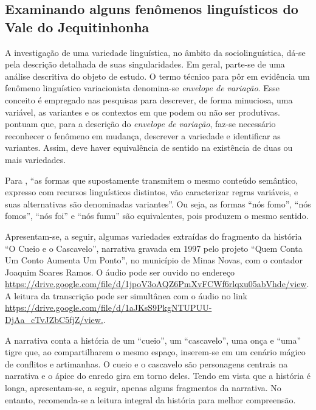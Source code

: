 \documentclass[portuguese]{textolivre}
\begin{document}
\subsection{Examinando alguns fenômenos linguísticos do Vale do Jequitinhonha}

A investigação de uma variedade linguística, no âmbito da sociolinguística, dá-se pela descrição detalhada de suas singularidades. Em geral, parte-se de uma análise descritiva do objeto de estudo. O termo técnico para pôr em evidência um fenômeno linguístico variacionista denomina-se \textit{envelope de variação}. Esse conceito é empregado nas pesquisas para descrever, de forma minuciosa, uma variável, as variantes e os contextos em que podem ou não ser produtivas. \textcite{coelho2012sociolinguistica} pontuam que, para a descrição do \textit{envelope de variação}, faz-se necessário reconhecer o fenômeno em mudança, descrever a variedade e identificar as variantes. Assim, deve haver equivalência de sentido na existência de duas ou mais variedades.
 
Para \textcite[p.~68]{BortoniRicardo2019}, “as formas que supostamente transmitem o mesmo conteúdo semântico, expresso com recursos linguísticos distintos, vão caracterizar regras variáveis, e suas alternativas são denominadas variantes”. Ou seja, as formas “nós fomo”, “nós fomos”, “nós foi” e “nós fumu” são equivalentes, pois produzem o mesmo sentido.

Apresentam-se, a seguir, algumas variedades extraídas do fragmento da história “O Cueio e o Cascavelo”, narrativa gravada em 1997 pelo projeto “Quem Conta Um Conto Aumenta Um Ponto”, no município de Minas Novas, com o contador Joaquim Soares Ramos. O áudio pode ser ouvido no endereço \url{https://drive.google.com/file/d/1jpoV3oAQZ6PmXvFCWf6rlqxu05abVhde/view}. A leitura da transcrição pode ser simultânea com o áudio no link \url{https://drive.google.com/file/d/1aJKsS9PkgNTUPUU-DjAa_cTvJZbC5fjZ/view.}. 

A narrativa conta a história de um “cueio”, um “cascavelo”, uma onça e “uma” tigre que, ao compartilharem o mesmo espaço, inserem-se em um cenário mágico de conflitos e artimanhas. O cueio e o cascavelo são personagens centrais na narrativa e o ápice do enredo gira em torno deles. Tendo em vista que a história é longa, apresentam-se, a seguir, apenas alguns fragmentos da narrativa. No entanto, recomenda-se a leitura integral da história para melhor compreensão.
\end{document}
